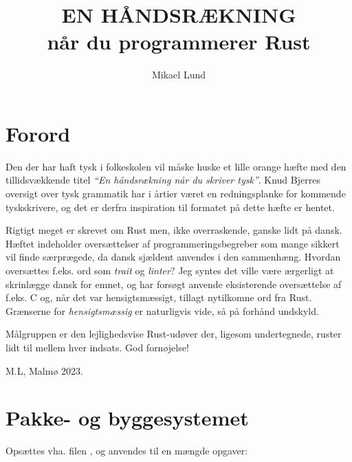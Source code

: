 \documentclass{article}
\author{Mikael Lund}
\title{EN HÅNDSRÆKNING\\når du programmerer Rust}
\date{}
\begin{document}
\maketitle
\begin{center}

\end{center}
\clearpage
\newpage
\tableofcontents



\newpage
\section*{Forord}

Den der har haft tysk i folkeskolen vil måske huske et lille orange hæfte med den tillids\-vækkende titel \emph{``En hånds\-rækning når du skriver tysk''}.
Knud Bjerres oversigt over tysk grammatik har i årtier været en redningsplanke for kommende tysk\-skrivere, og det er derfra inspiration til formatet på dette hæfte er hentet.

Rigtigt meget er skrevet om Rust men, ikke overraskende, ganske lidt på dansk.
Hæftet indeholder oversættelser af programmeringsbegreber som 
 mange sikkert vil finde særprægede, da dansk sjældent anvendes i den sammenhæng.
Hvordan oversættes f.eks. ord som \emph{trait} og \emph{linter}?
Jeg syntes det ville være ærgerligt at skrinlægge dansk for emnet, og har forsøgt anvende eksisterende oversættelse af f.eks. C og, når det var hensigtsmæssigt, tillagt nytilkomne ord fra Rust.
Grænserne for \emph{hensigtsmæssig} er naturligvis vide, så på for\-hånd undskyld.

Mål\-gruppen er den lejlig\-heds\-vise Rust-udøver der, ligesom undertegnede, ruster lidt til mellem hver indsats. God fornøjelse!

\vspace{0.5cm}
M.L, Malmø 2023.


\newpage
\section*{Pakke- og byggesystemet }
Opsættes vha. filen , og anvendes til en mængde opgaver:
\end{document}
